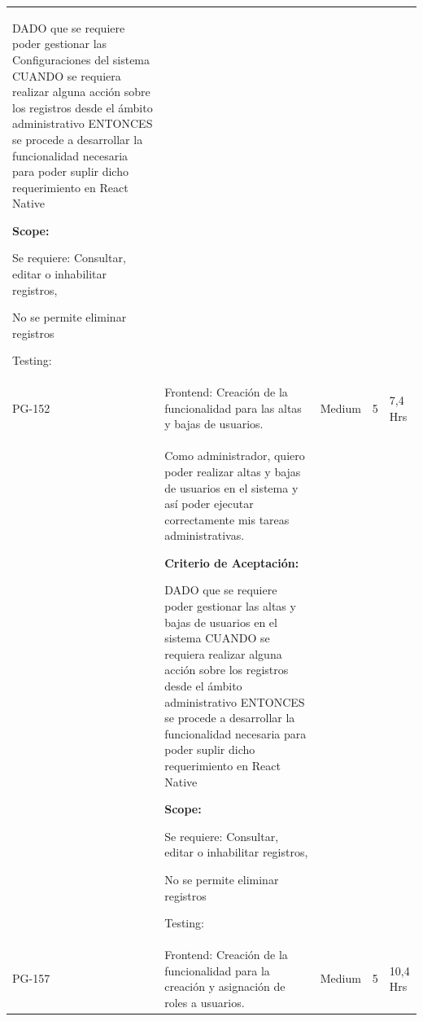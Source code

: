 \documentclass[11pt]{charter}
\begin{document}
\begin{landscape}
\begin{tabularx}{\linewidth}{@{}|p{1.3cm}|p{17cm}|p{1.7cm}|p{1.5cm}|p{1.7cm}|@{}}
\begin{description}
                   \item DADO que se requiere poder gestionar las Configuraciones del sistema CUANDO se requiera realizar alguna acción sobre los registros desde el   ámbito administrativo ENTONCES se procede a desarrollar la funcionalidad necesaria para poder   suplir dicho requerimiento en React Native                
                   \item \textbf{Scope:}                  
                         \item Se requiere: Consultar, editar o inhabilitar registros, 
                         \item No se permite eliminar registros                 
                   \item Testing:
            \end{description}                 &  &     & \\
PG-152   & Frontend: Creación de la   funcionalidad para las altas y bajas de usuarios.         & Medium             & 5   & 7,4  Hrs          \\
         &  \begin{description}                 
                   \item Como administrador, quiero poder   realizar altas y bajas de usuarios en el sistema y así poder ejecutar   correctamente mis tareas administrativas.                 
                   \item \textbf{Criterio de Aceptación:}                 
                   \item DADO que se requiere poder gestionar las altas y bajas de usuarios en el   sistema CUANDO se requiera realizar alguna acción sobre los registros desde el   ámbito administrativo ENTONCES se procede a desarrollar la funcionalidad necesaria para poder   suplir dicho requerimiento en React Native                
                   \item \textbf{Scope:}                  
                         \item Se requiere: Consultar, editar o inhabilitar registros, 
                         \item No se permite eliminar registros                 
                   \item Testing:
            \end{description}         &  &     & \\
PG-157   & Frontend: Creación de la   funcionalidad para la creación y asignación de roles a usuarios.            & Medium             & 5   & 10,4  Hrs         \\

\end{tabularx}
\end{landscape}
\end{document}
